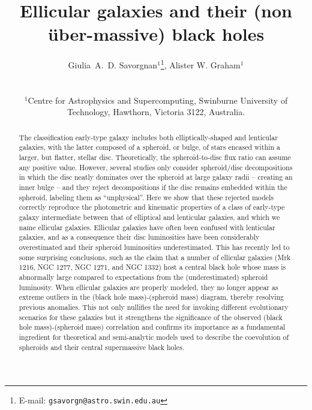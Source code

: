 \documentclass[useAMS,usenatbib,article]{mn2e}
\title[Ellicular galaxies]{Ellicular galaxies and their (non {\"u}ber-massive) black holes}
\author[G.~A.~D. Savorgnan \& A.~W. Graham]
{\parbox{\textwidth}{
Giulia~A.~D. Savorgnan$^{1}$\thanks{E-mail: \texttt{gsavorgn@astro.swin.edu.au}},
Alister W. Graham$^{1}$}\vspace{0.4cm}\\
\parbox{\textwidth}{
$^{1}$Centre for Astrophysics and Supercomputing, Swinburne University of Technology, Hawthorn, Victoria 3122, Australia.\\}}
\begin{document}
\maketitle

\label{firstpage}



\begin{abstract}
The classification early-type galaxy includes both elliptically-shaped and lenticular galaxies, 
with the latter composed of a spheroid, or bulge, of stars encased within a larger, but flatter, stellar disc. 
Theoretically, the spheroid-to-disc flux ratio can assume any positive value. 
However, several studies only consider spheroid/disc decompositions 
in which the disc neatly dominates over the spheroid at large galaxy radii -- creating an inner bulge -- 
and they reject decompositions if the disc remains embedded within the spheroid, labeling them as ``unphysical''. 
Here we show that these rejected models correctly reproduce the photometric and kinematic properties of a class of early-type galaxy 
intermediate between that of elliptical and lenticular galaxies, and which we name ellicular galaxies. 
Ellicular galaxies have often been confused with lenticular galaxies, and as a consequence their disc luminosities have been considerably overestimated 
and their spheroid luminosities underestimated. 
This has recently led to some surprising conclusions, 
such as the claim that a number of ellicular galaxies (Mrk 1216, NGC 1277, NGC 1271, and NGC 1332) 
host a central black hole whose mass is abnormally large compared to expectations from the (underestimated) spheroid luminosity. 
When ellicular galaxies are properly modeled, 
they no longer appear as extreme outliers in the (black hole mass)-(spheroid mass) diagram, 
thereby resolving previous anomalies. 
This not only nullifies the need for invoking different evolutionary scenarios for these galaxies 
but it strengthens the significance of the observed (black hole mass)-(spheroid mass) correlation 
and confirms its importance as a fundamental ingredient for theoretical and semi-analytic models 
used to describe the coevolution of spheroids and their central supermassive black holes. 

\end{abstract}
\end{document}
